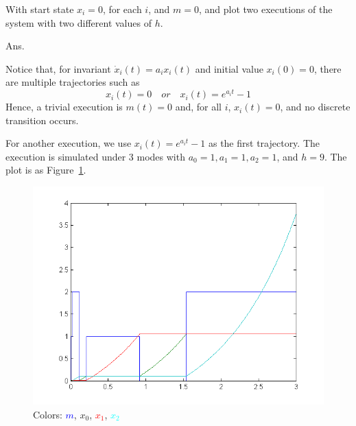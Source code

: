 \documentclass[11pt]{article}
\begin{document}
With start state $x_i = 0$, for each $i$, and $m = 0$, and plot two executions of the system with two different values of $h$.

Ans.

Notice that, for invariant $\dot{x}_i(t) = a_i x_i(t)$ and initial value $x_i(0) = 0$,
there are multiple trajectories such as
\[
 x_i(t) = 0 \quad or\quad x_i(t) = e^{a_i t} - 1
\]
Hence, a trivial execution is $m(t) = 0$ and, for all $i$, $x_i(t) = 0$,
and no discrete transition occurs.

For another execution, we use $x_i(t) = e^{a_i t} - 1$ as the first trajectory.
The execution is simulated under 3 modes with  $a_0=1, a_1=1, a_2=1$, and $h=9$.
The plot is as Figure~\ref{fig:execution}.

\begin{figure}
    \centering
    \caption{Colors: \textcolor{blue}{$m$}, \textcolor{OliveGreen}{$x_0$}, \textcolor{red}{$x_1$}, \textcolor{cyan}{$x_2$}}\label{fig:execution}
    \includegraphics{execution-1}
\end{figure}




\end{document}
